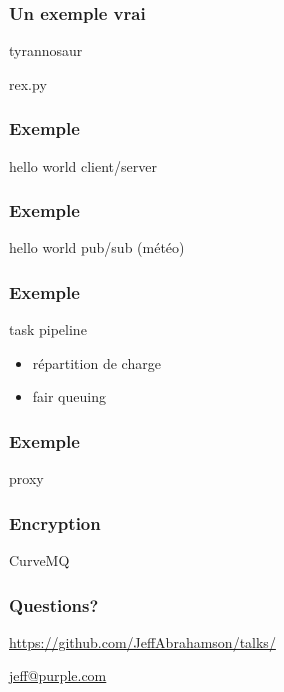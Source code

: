 \documentclass{beamer}
\begin{document}
\begin{frame}
  \frametitle{Un exemple vrai}

  \centerline{tyrannosaur}
  \centerline{rex.py}
\end{frame}

\begin{frame}
  \frametitle{Exemple}

  \centerline{hello world client/server}
\end{frame}

\begin{frame}
  \frametitle{Exemple}

    \centerline{hello world pub/sub (météo)}
\end{frame}

\begin{frame}
  \frametitle{Exemple}

  \centerline{task pipeline}

  \begin{itemize}
  \item répartition de charge
  \item fair queuing
  \end{itemize}
\end{frame}

\begin{frame}
  \frametitle{Exemple}

  \centerline{proxy}
\end{frame}

\begin{frame}
  \frametitle{Encryption}

  \centerline{CurveMQ}
\end{frame}

\begin{frame}
  \frametitle{Questions?}

  \centerline{\url{https://github.com/JeffAbrahamson/talks/}}
  \vspace{1cm}
  \centerline{\url{jeff@purple.com}}
\end{frame}
\end{document}
